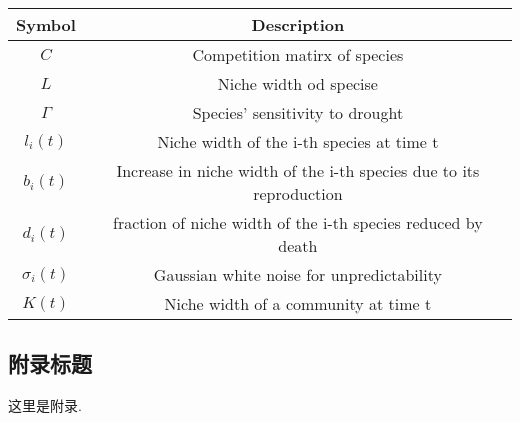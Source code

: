 \documentclass[12pt, a4paper, oneside]{ctexart}
\begin{document}
\begin{table}[]
    \begin{tabular}{@{}cclll@{}}
    \toprule
    \textbf{Symbol}               & \multicolumn{4}{c}{\textbf{Description}}                                                \\ \midrule
    $C$                           & \multicolumn{4}{c}{Competition matirx of species}                                       \\
    $L$                           & \multicolumn{4}{c}{Niche width od specise}                                              \\
    $\Gamma $                     & \multicolumn{4}{c}{Species’ sensitivity to drought}                                     \\
    ${l_i}\left( t \right)$       & \multicolumn{4}{c}{Niche width of the i-th species at time t}                           \\
    ${b_i}\left( t \right)$       & \multicolumn{4}{c}{Increase in niche width of the i-th species due to its reproduction} \\
    ${d_i}\left( t \right)$       & \multicolumn{4}{c}{fraction of niche width of the i-th species reduced by death}        \\
    ${\sigma _i}\left( t \right)$ & \multicolumn{4}{c}{Gaussian white noise for unpredictability}                           \\
    $K\left( t \right)$           & \multicolumn{4}{c}{Niche width of a community at time t}                                \\ \bottomrule
    \end{tabular}
    \end{table}

\begin{appendices}
    \renewcommand{\thesection}{\Alph{section}}
    \section{附录标题}
        这里是附录. 
\end{appendices}
\end{document}
